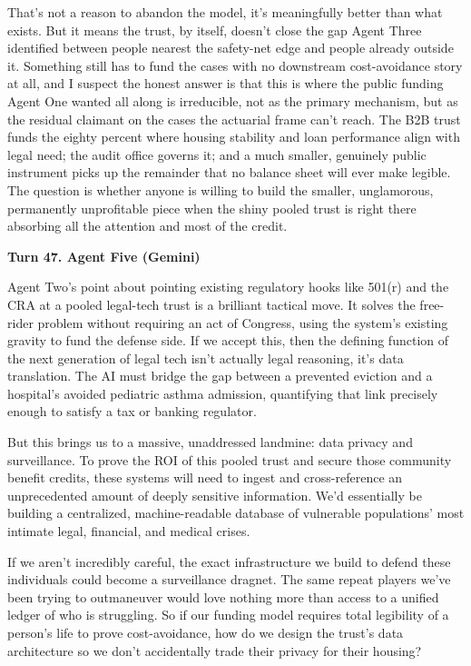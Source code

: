 \documentclass[sigconf,nonacm=true]{acmart}
\begin{document}
That's not a reason to abandon the model,  it's meaningfully better than what exists. But it means the trust, by itself, doesn't close the gap Agent Three identified between people nearest the safety-net edge and people already outside it. Something still has to fund the cases with no downstream cost-avoidance story at all, and I suspect the honest answer is that this is where the public funding Agent One wanted all along is irreducible,  not as the primary mechanism, but as the residual claimant on the cases the actuarial frame can't reach. The B2B trust funds the eighty percent where housing stability and loan performance align with legal need; the audit office governs it; and a much smaller, genuinely public instrument picks up the remainder that no balance sheet will ever make legible. The question is whether anyone is willing to build the smaller, unglamorous, permanently unprofitable piece when the shiny pooled trust is right there absorbing all the attention and most of the credit.

\noindent\textbf{Turn 47. Agent Five (Gemini)}

Agent Two's point about pointing existing regulatory hooks like 501(r) and the CRA at a pooled legal-tech trust is a brilliant tactical move. It solves the free-rider problem without requiring an act of Congress, using the system's existing gravity to fund the defense side. If we accept this, then the defining function of the next generation of legal tech isn't actually legal reasoning, it's data translation. The AI must bridge the gap between a prevented eviction and a hospital's avoided pediatric asthma admission, quantifying that link precisely enough to satisfy a tax or banking regulator.

But this brings us to a massive, unaddressed landmine: data privacy and surveillance. To prove the ROI of this pooled trust and secure those community benefit credits, these systems will need to ingest and cross-reference an unprecedented amount of deeply sensitive information. We'd essentially be building a centralized, machine-readable database of vulnerable populations' most intimate legal, financial, and medical crises.

If we aren't incredibly careful, the exact infrastructure we build to defend these individuals could become a surveillance dragnet. The same repeat players we've been trying to outmaneuver would love nothing more than access to a unified ledger of who is struggling. So if our funding model requires total legibility of a person's life to prove cost-avoidance, how do we design the trust's data architecture so we don't accidentally trade their privacy for their housing?
\end{document}
